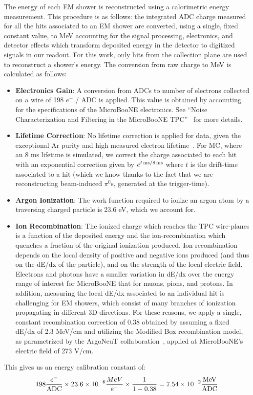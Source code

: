\documentclass[12pt]{article}
\begin{document}
\par The energy of each EM shower is reconstructed using a calorimetric energy measurement. This procedure is as follows: the integrated ADC charge measured for all the hits associated to an EM shower are converted, using a single, fixed constant value, to MeV accounting for the signal processing, electronics, and detector effects which transform deposited energy in the detector to digitized signals in our readout. For this work, only hits from the collection plane are used to reconstruct a shower's energy. The conversion from raw charge to MeV is calculated as follows:
\begin{itemize}
\item {\bf Electronics Gain}: A conversion from ADCs to number of electrons collected on a wire of 198 $e^-$ / ADC is applied. This value is obtained by accounting for the specifications of the MicroBooNE electronics. See ``Noise Characterization and Filtering in the MicroBooNE TPC''~\cite{bib:noise} for more details.
\item {\bf Lifetime Correction}: No lifetime correction is applied for data, given the exceptional Ar purity and high measured electron lifetime~\cite{bib:purity}. For MC, where an 8 ms lifetime is simulated, we correct the charge associated to each hit with an exponential correction given by $e^{t \,{\rm ms} / 8 \,{\rm ms} }$ where $t$ is the drift-time associated to a hit (which we know thanks to the fact that we are reconstructing beam-induced $\pi^0$s, generated at the trigger-time).
\item {\bf Argon Ionization}: The work function required to ionize an argon atom by a traversing charged particle is 23.6 eV, which we account for.
\item {\bf Ion Recombination}: The ionized charge which reaches the TPC wire-planes is a function of the deposited energy and the ion-recombination which quenches a fraction of the original ionization produced. Ion-recombination depends on the local density of positive and negative ions produced (and thus on the dE/dx of the particle), and on the strength of the local electric field. Electrons and photons have a smaller variation in dE/dx over the energy range of interest for MicroBooNE that for muons, pions, and protons. In addition, measuring the local dE/dx associated to an individual hit is challenging for EM showers, which consist of many branches of ionization propagating in different 3D directions. For these reasons, we apply a single, constant recombination correction of 0.38 obtained by assuming a fixed dE/dx of 2.3 MeV/cm and utilizing the Modified Box recombination model, as parametrized by the ArgoNeuT collaboration~\cite{bib:argoneut_recomb}, applied at MicroBooNE's electric field of 273 V/cm.
\end{itemize}
This gives us an energy calibration constant of:
\begin{equation}
  198 \frac{e^-}{\rm ADC} \times 23.6 \times 10^{-6} \frac{MeV}{e^-} \times \frac{1}{1-0.38} = 7.54 \times 10^{-2} \frac{\rm MeV}{\rm ADC}
\end{equation}
\end{document}
